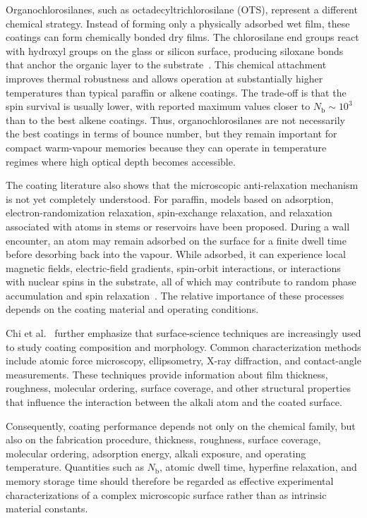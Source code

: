 Organochlorosilanes, such as octadecyltrichlorosilane (OTS), represent a different chemical strategy. Instead of forming only a physically adsorbed wet film, these coatings can form chemically bonded dry films. The chlorosilane end groups react with hydroxyl groups on the glass or silicon surface, producing siloxane bonds that anchor the organic layer to the substrate~\cite{Aiacoavc_ChiEtAl_2020}. This chemical attachment improves thermal robustness and allows operation at substantially higher temperatures than typical paraffin or alkene coatings. The trade-off is that the spin survival is usually lower, with reported maximum values closer to $N_{\mathrm{b}}\sim10^{3}$ than to the best alkene coatings. Thus, organochlorosilanes are not necessarily the best coatings in terms of bounce number, but they remain important for compact warm-vapour memories because they can operate in temperature regimes where high optical depth becomes accessible.

The coating literature also shows that the microscopic anti-relaxation mechanism is not yet completely understood. For paraffin, models based on adsorption, electron-randomization relaxation, spin-exchange relaxation, and relaxation associated with atoms in stems or reservoirs have been proposed. During a wall encounter, an atom may remain adsorbed on the surface for a finite dwell time before desorbing back into the vapour. While adsorbed, it can experience local magnetic fields, electric-field gradients, spin-orbit interactions, or interactions with nuclear spins in the substrate, all of which may contribute to random phase accumulation and spin relaxation~\cite{OP_Happer_1972,Aiacoavc_ChiEtAl_2020}. The relative importance of these processes depends on the coating material and operating conditions.

Chi et al.~\cite{Aiacoavc_ChiEtAl_2020} further emphasize that surface-science techniques are increasingly used to study coating composition and morphology. Common characterization methods include atomic force microscopy, ellipsometry, X-ray diffraction, and contact-angle measurements. These techniques provide information about film thickness, roughness, molecular ordering, surface coverage, and other structural properties that influence the interaction between the alkali atom and the coated surface.

Consequently, coating performance depends not only on the chemical family, but also on the fabrication procedure, thickness, roughness, surface coverage, molecular ordering, adsorption energy, alkali exposure, and operating temperature. Quantities such as $N_{\mathrm{b}}$, atomic dwell time, hyperfine relaxation, and memory storage time should therefore be regarded as effective experimental characterizations of a complex microscopic surface rather than as intrinsic material constants.
